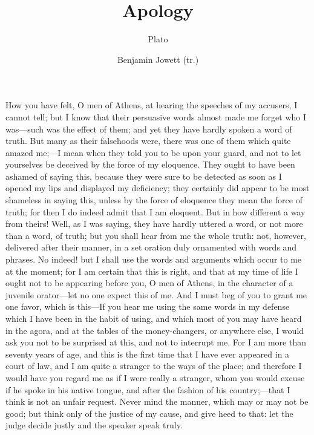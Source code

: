 \documentclass[12pt]{article}
\title{Apology}
\author{Plato \and Benjamin Jowett (tr.)}
\date{}
\begin{document}
\maketitle

\noindent How you have felt, O men of Athens, at hearing the speeches of my
accusers, I cannot tell; but I know that their persuasive words almost
made me forget who I was---such was the effect of them; and yet they
have hardly spoken a word of truth. But many as their falsehoods were,
there was one of them which quite amazed me;---I mean when they told
you to be upon your guard, and not to let yourselves be deceived by
the force of my eloquence. They ought to have been ashamed of saying
this, because they were sure to be detected as soon as I opened my
lips and displayed my deficiency; they certainly did appear to be
most shameless in saying this, unless by the force of eloquence they
mean the force of truth; for then I do indeed admit that I am eloquent.
But in how different a way from theirs! Well, as I was saying, they
have hardly uttered a word, or not more than a word, of truth; but
you shall hear from me the whole truth: not, however, delivered after
their manner, in a set oration duly ornamented with words and phrases.
No indeed! but I shall use the words and arguments which occur to
me at the moment; for I am certain that this is right, and that at
my time of life I ought not to be appearing before you, O men of Athens,
in the character of a juvenile orator---let no one expect this of
me. And I must beg of you to grant me one favor, which is this---If
you hear me using the same words in my defense which I have been in
the habit of using, and which most of you may have heard in the agora,
and at the tables of the money-changers, or anywhere else, I would
ask you not to be surprised at this, and not to interrupt me. For
I am more than seventy years of age, and this is the first time that
I have ever appeared in a court of law, and I am quite a stranger
to the ways of the place; and therefore I would have you regard me
as if I were really a stranger, whom you would excuse if he spoke
in his native tongue, and after the fashion of his country;---that
I think is not an unfair request. Never mind the manner, which may
or may not be good; but think only of the justice of my cause, and
give heed to that: let the judge decide justly and the speaker speak
truly.
\end{document}
